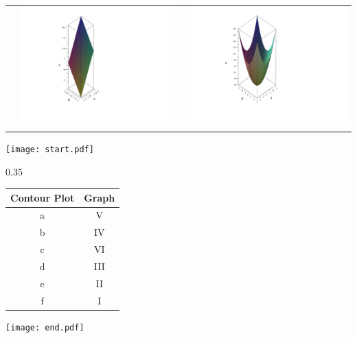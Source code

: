 \documentclass[12pt]{article}
\begin{document}
\begin{enumerate}
\begin{center}
\begin{tabular}{lc|cc}
&\includegraphics[scale=0.45]{matchingf.pdf} && \includegraphics[scale=0.45]{matchingc.pdf}
\end{tabular}
\end{center}

\newpage

\texttt{[image: start.pdf]}
{{{0.35\linewidth}{\begin{center}\begin{tabular}{c|c}
{\bf Contour Plot} & {\bf Graph}\\
\hline
a & V\\
b & IV\\
c & VI\\
d & III\\
e & II\\
f & I
\end{tabular}\end{center}}}}
\texttt{[image: end.pdf]}



\end{enumerate}
\end{document}
